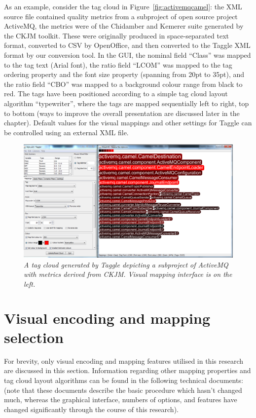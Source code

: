 As an example, consider the tag cloud in Figure~\vref{fig:activemqcamel}: the XML source file contained quality metrics from a subproject of open source project  ActiveMQ, the metrics were of the Chidamber and Kemerer suite generated by the CKJM toolkit. These were originally produced in space-separated text format, converted to CSV by OpenOffice, and then converted to the Taggle XML format by our conversion tool. In the GUI, the nominal field ``Class'' was mapped to the tag text (Arial font), the ratio field ``LCOM'' was mapped to the tag ordering property and the font size property (spanning from 20pt to 35pt), and the ratio field ``CBO'' was mapped to a background colour range from black to red. The tags have been positioned according to a simple tag cloud layout algorithm ``typewriter'', where the tags are mapped sequentially left to right, top to bottom (ways to improve the overall presentation are discussed later in the chapter). Default values for the visual mappings and other settings for Taggle can be controlled using an external XML file. 

\begin{figure}[!htb]
  	\centering
   	\includegraphics{activemqcamel.png}
  	\caption{\textit{A tag cloud generated by Taggle depicting a subproject of ActiveMQ with metrics derived from CKJM. Visual mapping interface is on the left.}}
	\label{fig:activemqcamel}
\end{figure}

\section{Visual encoding and mapping selection}\label{sect:visualencoding}

For brevity, only visual encoding and mapping features utilised in this research are discussed in this section. Information regarding other mapping properties and tag cloud layout algorithms can be found in the following technical documents: \citet{deaker11, deaker11c} (note that these documents describe the basic procedure which hasn't changed much, whereas the graphical interface, numbers of options, and features have changed significantly through the course of this research).


